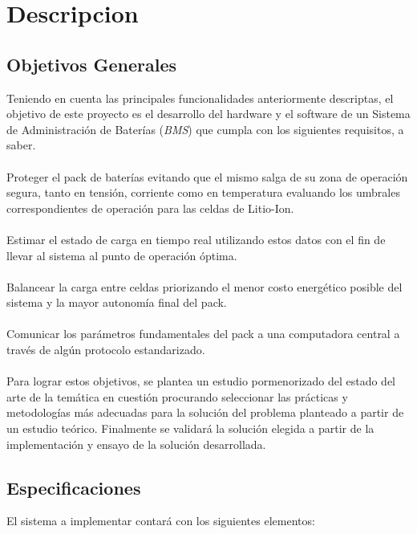 \documentclass[10pt,a4paper]{article}
\begin{document}
\clearpage

\section{Descripcion}

\subsection{Objetivos Generales}

\noindent Teniendo en cuenta las principales funcionalidades anteriormente descriptas, el objetivo de este proyecto es el desarrollo del hardware y el software de un Sistema de Administración de Baterías (\emph{BMS}) que cumpla con los siguientes requisitos, a saber.\\
\\
\noindent Proteger el pack de baterías evitando que el mismo salga de su zona de operación segura, tanto en tensión, corriente como en temperatura evaluando los umbrales correspondientes de operación para las celdas de Litio-Ion.\\
\\
\noindent Estimar el estado de carga en tiempo real utilizando estos datos con el fin de llevar al sistema al punto de operación óptima.\\
\\
\noindent Balancear la carga entre celdas priorizando el menor costo energético posible del sistema y la mayor autonomía final del pack.\\
\\
\noindent Comunicar los parámetros fundamentales del pack a una computadora central a través de algún protocolo estandarizado.\\
\\
\noindent Para lograr estos objetivos, se plantea un estudio pormenorizado del estado del arte de la temática en cuestión procurando seleccionar las prácticas y metodologías más adecuadas para la solución del problema planteado a partir de un estudio teórico. Finalmente se validará la solución elegida a partir de la implementación y ensayo de la solución desarrollada.

\subsection{Especificaciones}

El sistema a implementar  contará con los siguientes elementos:
\end{document}
